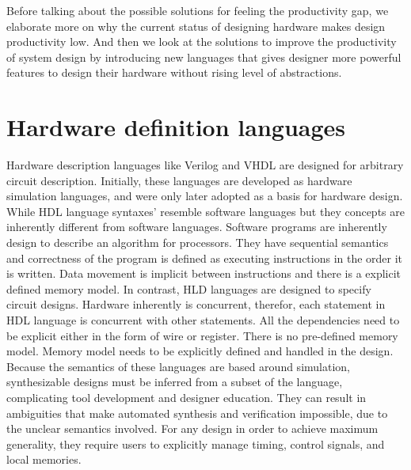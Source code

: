Before talking about the possible solutions for feeling the productivity gap, we elaborate more on why the current status of designing hardware makes design productivity low. And then we look at the solutions to improve the productivity of system design by introducing new languages that gives designer more powerful features to design their hardware without rising level of abstractions.


\section{Hardware definition languages}

Hardware description languages like Verilog and VHDL are designed for arbitrary circuit description.
Initially, these languages are developed as hardware simulation languages, and were only later adopted as a basis for hardware design.
While HDL language syntaxes' resemble software languages but they concepts are inherently different from software languages.
Software programs are inherently design to describe an algorithm for processors.
They have sequential semantics and correctness of the program is defined as executing instructions in the order it is written. Data movement is implicit between instructions and there is a explicit defined memory model.
In contrast, HLD languages are designed to specify circuit designs.
Hardware inherently is concurrent, therefor, each statement in HDL language is concurrent with other statements.
All the dependencies need to be explicit either in the form of wire or register.
There is no pre-defined memory model. Memory model needs to be explicitly defined and handled in the design.
Because the semantics of these languages are based around simulation, synthesizable designs must be inferred from a subset of the language, complicating tool development and designer education.
They can result in ambiguities that make automated synthesis and verification impossible, due to the unclear semantics involved.
For any design in order to achieve maximum generality, they require users to explicitly manage timing, control signals, and local memories.

